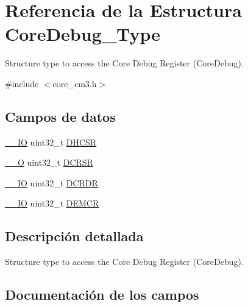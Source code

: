 \hypertarget{struct_core_debug___type}{}\section{Referencia de la Estructura Core\+Debug\+\_\+\+Type}
\label{struct_core_debug___type}


Structure type to access the Core Debug Register (Core\+Debug).  




{\ttfamily \#include $<$core\+\_\+cm3.\+h$>$}

\subsection*{Campos de datos}
\begin{DoxyCompactItemize}
\item 
\mbox{\hyperlink{core__cm3_8h_aec43007d9998a0a0e01faede4133d6be}{\+\_\+\+\_\+\+IO}} uint32\+\_\+t \mbox{\hyperlink{struct_core_debug___type_a39bc5e68dc6071187fbe2348891eabfa}{D\+H\+C\+SR}}
\item 
\mbox{\hyperlink{core__cm3_8h_a7e25d9380f9ef903923964322e71f2f6}{\+\_\+\+\_\+O}} uint32\+\_\+t \mbox{\hyperlink{struct_core_debug___type_a7b49cb58573da77cc8a83a1b21262180}{D\+C\+R\+SR}}
\item 
\mbox{\hyperlink{core__cm3_8h_aec43007d9998a0a0e01faede4133d6be}{\+\_\+\+\_\+\+IO}} uint32\+\_\+t \mbox{\hyperlink{struct_core_debug___type_a5bcffe99d1d5471d5e5befbc6272ebf0}{D\+C\+R\+DR}}
\item 
\mbox{\hyperlink{core__cm3_8h_aec43007d9998a0a0e01faede4133d6be}{\+\_\+\+\_\+\+IO}} uint32\+\_\+t \mbox{\hyperlink{struct_core_debug___type_a6cdfc0a6ce3e988cc02c2d6e8107d193}{D\+E\+M\+CR}}
\end{DoxyCompactItemize}


\subsection{Descripción detallada}
Structure type to access the Core Debug Register (Core\+Debug). 

\subsection{Documentación de los campos}
\mbox{\label{struct_core_debug___type_a5bcffe99d1d5471d5e5befbc6272ebf0}} 
